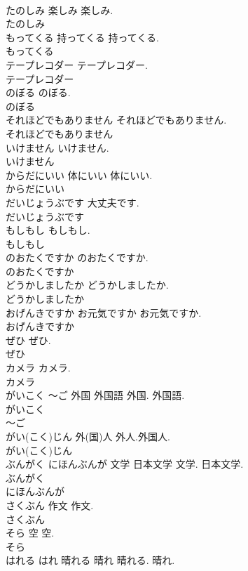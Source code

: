 \documentclass[8pt]{extreport}
\begin{document}
\begin{CJK}{UTF8}{min}
\\	たのしみ	楽しみ	楽しみ.	
\\	たのしみ
\\	もってくる	持ってくる	持ってくる.	
\\	もってくる
\\	テープレコダー		テープレコダー.	
\\	テープレコダー
\\	のぼる		のぼる.	
\\	のぼる
\\	それほどでもありません		それほどでもありません.	
\\	それほどでもありません
\\	いけません		いけません.	
\\	いけません
\\	からだにいい	体にいい	体にいい.	
\\	からだにいい
\\	だいじょうぶです		大丈夫です.	
\\	だいじょうぶです
\\	もしもし		もしもし.	
\\	もしもし
\\	のおたくですか		のおたくですか.	
\\	のおたくですか
\\	どうかしましたか		どうかしましたか.	
\\	どうかしましたか
\\	おげんきですか	お元気ですか	お元気ですか.	
\\	おげんきですか
\\	ぜひ		ぜひ.	
\\	ぜひ
\\	カメラ		カメラ.	
\\	カメラ
\\	がいこく ～ご	外国 外国語	外国. 外国語.	
\\	がいこく
\\	～ご
\\	がい(こく)じん	外(国)人	外人.外国人.	
\\	がい(こく)じん
\\	ぶんがく にほんぶんが	文学 日本文学	文学. 日本文学.	
\\	ぶんがく
\\	にほんぶんが
\\	さくぶん	作文	作文.	
\\	さくぶん
\\	そら	空	空.	
\\	そら
\\	はれる はれ	晴れる 晴れ	晴れる. 晴れ.	

\end{CJK}
\end{document}
